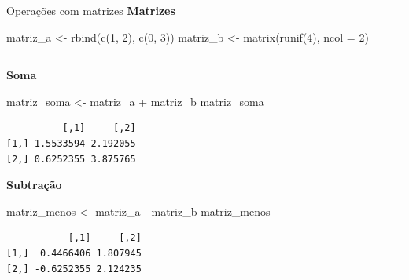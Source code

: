 \documentclass[
  10pt,
  ignorenonframetext,
]{beamer}
\newenvironment{Shaded}{\begin{snugshade}}{\end{snugshade}}
\newcommand{\AttributeTok}[1]{\textcolor[rgb]{0.40,0.45,0.13}{#1}}
\newcommand{\DecValTok}[1]{\textcolor[rgb]{0.68,0.00,0.00}{#1}}
\newcommand{\FunctionTok}[1]{\textcolor[rgb]{0.28,0.35,0.67}{#1}}
\newcommand{\NormalTok}[1]{\textcolor[rgb]{0.00,0.23,0.31}{#1}}
\newcommand{\OtherTok}[1]{\textcolor[rgb]{0.00,0.23,0.31}{#1}}
\newcommand{\SpecialCharTok}[1]{\textcolor[rgb]{0.37,0.37,0.37}{#1}}
\newcommand*{\regrafina}{\rule{\textwidth}{0.5pt}}
\begin{document}
\begin{frame}[fragile]{Operações com matrizes}
\protect\hypertarget{operauxe7uxf5es-com-matrizes}{}
\textbf{Matrizes}

\begin{Shaded}
\begin{Highlighting}[]
\NormalTok{matriz\_a }\OtherTok{\textless{}{-}} \FunctionTok{rbind}\NormalTok{(}\FunctionTok{c}\NormalTok{(}\DecValTok{1}\NormalTok{, }\DecValTok{2}\NormalTok{), }\FunctionTok{c}\NormalTok{(}\DecValTok{0}\NormalTok{, }\DecValTok{3}\NormalTok{))}
\NormalTok{matriz\_b }\OtherTok{\textless{}{-}} \FunctionTok{matrix}\NormalTok{(}\FunctionTok{runif}\NormalTok{(}\DecValTok{4}\NormalTok{), }\AttributeTok{ncol =} \DecValTok{2}\NormalTok{)}
\end{Highlighting}
\end{Shaded}

\regrafina

\small

\textbf{Soma}

\begin{Shaded}
\begin{Highlighting}[]
\NormalTok{matriz\_soma }\OtherTok{\textless{}{-}}\NormalTok{ matriz\_a }\SpecialCharTok{+}\NormalTok{ matriz\_b}
\NormalTok{matriz\_soma}
\end{Highlighting}
\end{Shaded}

\begin{verbatim}
          [,1]     [,2]
[1,] 1.5533594 2.192055
[2,] 0.6252355 3.875765
\end{verbatim}

\textbf{Subtração}

\begin{Shaded}
\begin{Highlighting}[]
\NormalTok{matriz\_menos }\OtherTok{\textless{}{-}}\NormalTok{ matriz\_a }\SpecialCharTok{{-}}\NormalTok{ matriz\_b}
\NormalTok{matriz\_menos}
\end{Highlighting}
\end{Shaded}

\begin{verbatim}
           [,1]     [,2]
[1,]  0.4466406 1.807945
[2,] -0.6252355 2.124235
\end{verbatim}

\normalsize
\end{frame}
\end{document}
